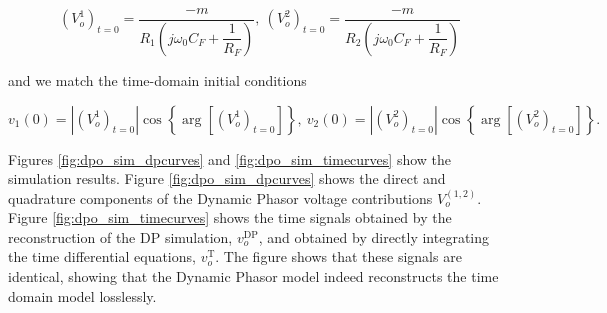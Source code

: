 \begin{equation} \left(V_o^1\right)_{t=0} = \dfrac{-m}{R_1\left(j\omega_0C_F + \dfrac{1}{R_F}\right)},\ \left(V_o^2\right)_{t=0} = \dfrac{-m}{R_2\left(j\omega_0C_F + \dfrac{1}{R_F}\right)} \end{equation}

	\noindent and we match the time-domain initial conditions

\begin{equation} v_1(0) = \left\lvert\left(V_o^1\right)_{t=0}\right\rvert \cos\left\{\arg\left[\left(V_o^1\right)_{t=0}\right]\right\},\ v_2(0) = \left\lvert\left(V_o^2\right)_{t=0}\right\rvert \cos\left\{\arg\left[\left(V_o^2\right)_{t=0}\right]\right\} .\end{equation}

	Figures \ref{fig:dpo_sim_dpcurves} and \ref{fig:dpo_sim_timecurves} show the simulation results. Figure \ref{fig:dpo_sim_dpcurves} shows the direct and quadrature components of the Dynamic Phasor voltage contributions $V_o^{(1,2)}$. Figure \ref{fig:dpo_sim_timecurves} shows the time signals obtained by the reconstruction of the DP simulation, $v_o^{\text{DP}}$, and obtained by directly integrating the time differential equations, $v_o^{\text{T}}$. The figure shows that these signals are identical, showing that the Dynamic Phasor model indeed reconstructs the time domain model losslessly.

